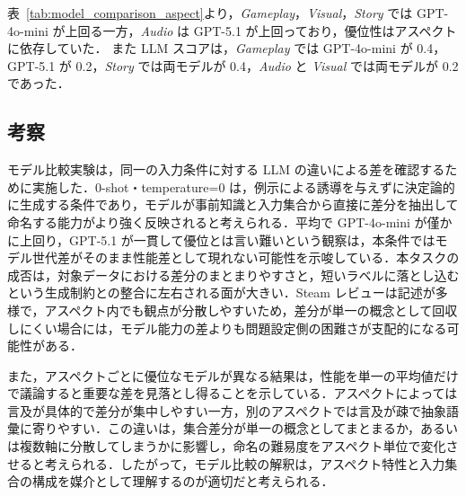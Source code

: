 表~\ref{tab:model_comparison_aspect}より，\textit{Gameplay}，\textit{Visual}，\textit{Story} では GPT-4o-mini が上回る一方，\textit{Audio} は GPT-5.1 が上回っており，優位性はアスペクトに依存していた．
また LLM スコアは，\textit{Gameplay} では GPT-4o-mini が 0.4，GPT-5.1 が 0.2，\textit{Story} では両モデルが 0.4，\textit{Audio} と \textit{Visual} では両モデルが 0.2 であった．

\subsection{考察}
モデル比較実験は，同一の入力条件に対する LLM の違いによる差を確認するために実施した．0-shot・temperature=0 は，例示による誘導を与えずに決定論的に生成する条件であり，モデルが事前知識と入力集合から直接に差分を抽出して命名する能力がより強く反映されると考えられる．平均で GPT-4o-mini が僅かに上回り，GPT-5.1 が一貫して優位とは言い難いという観察は，本条件ではモデル世代差がそのまま性能差として現れない可能性を示唆している．本タスクの成否は，対象データにおける差分のまとまりやすさと，短いラベルに落とし込むという生成制約との整合に左右される面が大きい．Steam レビューは記述が多様で，アスペクト内でも観点が分散しやすいため，差分が単一の概念として回収しにくい場合には，モデル能力の差よりも問題設定側の困難さが支配的になる可能性がある．

また，アスペクトごとに優位なモデルが異なる結果は，性能を単一の平均値だけで議論すると重要な差を見落とし得ることを示している．アスペクトによっては言及が具体的で差分が集中しやすい一方，別のアスペクトでは言及が疎で抽象語彙に寄りやすい．この違いは，集合差分が単一の概念としてまとまるか，あるいは複数軸に分散してしまうかに影響し，命名の難易度をアスペクト単位で変化させると考えられる．したがって，モデル比較の解釈は，アスペクト特性と入力集合の構成を媒介として理解するのが適切だと考えられる．


